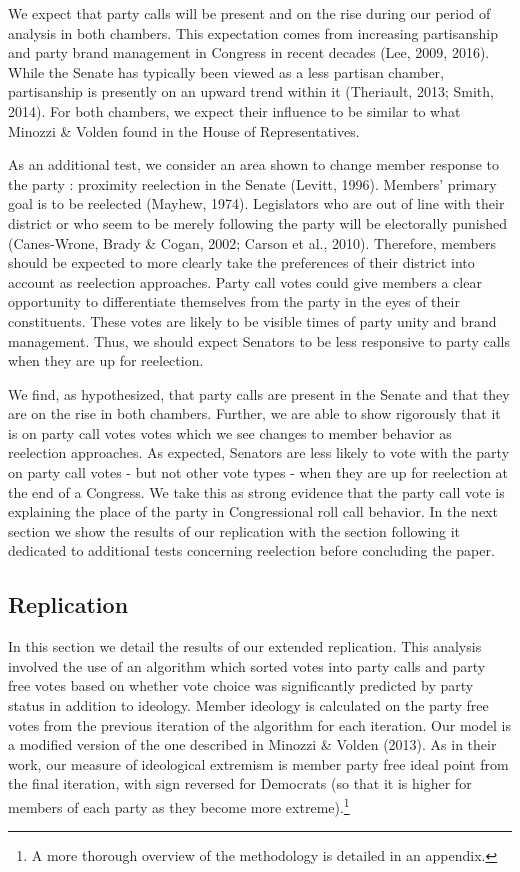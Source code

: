 \documentclass[12pt]{article}
\begin{document}
We expect that party calls will be present and on the rise during our period of analysis in both chambers. This expectation comes from increasing partisanship and party brand management in Congress in recent decades (Lee, 2009, 2016). While the Senate has typically been viewed as a less partisan chamber, partisanship is presently on an upward trend within it (Theriault, 2013; Smith, 2014). For both chambers, we expect their influence to be similar to what Minozzi \& Volden found in the House of Representatives.

As an additional test, we consider an area shown to change member response to the party : proximity reelection in the Senate (Levitt, 1996). Members' primary goal is to be reelected (Mayhew, 1974). Legislators who are out of line with their district or who seem to be merely following the party will be electorally punished (Canes-Wrone, Brady \& Cogan, 2002; Carson et al., 2010). Therefore, members should be expected to more clearly take the preferences of their district into account as reelection approaches. Party call votes could give members a clear opportunity to differentiate themselves from the party in the eyes of their constituents. These votes are likely to be visible times of party unity and brand management. Thus, we should expect Senators to be less responsive to party calls when they are up for reelection.

We find, as hypothesized, that party calls are present in the Senate and that they are on the rise in both chambers. Further, we are able to show rigorously that it is on party call votes votes which we see changes to member behavior as reelection approaches. As expected, Senators are less likely to vote with the party on party call votes - but not other vote types - when they are up for reelection at the end of a Congress. We take this as strong evidence that the party call vote is explaining the place of the party in Congressional roll call behavior. In the next section we show the results of our replication with the section following it dedicated to additional tests concerning reelection before concluding the paper.

\subsection{Replication}

In this section we detail the results of our extended replication. This analysis involved the use of an algorithm which sorted votes into party calls and party free votes based on whether vote choice was significantly predicted by party status in addition to ideology. Member ideology is calculated on the party free votes from the previous iteration of the algorithm for each iteration. Our model is a modified version of the one described in Minozzi \& Volden (2013). As in their work, our measure of ideological extremism is member party free ideal point from the final iteration, with sign reversed for Democrats (so that it is higher for members of each party as they become more extreme).\footnote{A more thorough overview of the methodology is detailed in an appendix.}
\end{document}
